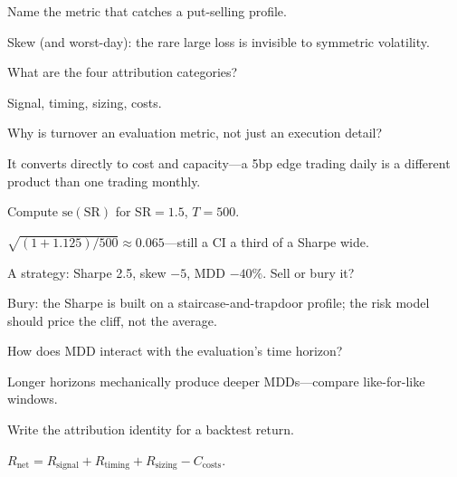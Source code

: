 \begin{exercise}[easy]
Name the metric that catches a put-selling profile.
\end{exercise}
\begin{solution}
Skew (and worst-day): the rare large loss is invisible to symmetric volatility.
\end{solution}

\begin{exercise}[easy]
What are the four attribution categories?
\end{exercise}
\begin{solution}
Signal, timing, sizing, costs.
\end{solution}

\begin{exercise}[easy]
Why is turnover an evaluation metric, not just an execution detail?
\end{exercise}
\begin{solution}
It converts directly to cost and capacity---a 5bp edge trading daily is a different
product than one trading monthly.
\end{solution}

\begin{exercise}
Compute $\mathrm{se}(\mathrm{SR})$ for SR${=}1.5$, $T{=}500$.
\end{exercise}
\begin{solution}
$\sqrt{(1+1.125)/500}\approx0.065$---still a CI a third of a Sharpe wide.
\end{solution}

\begin{exercise}
A strategy: Sharpe 2.5, skew $-5$, MDD $-40\%$. Sell or bury it?
\end{exercise}
\begin{solution}
Bury: the Sharpe is built on a staircase-and-trapdoor profile; the risk model should
price the cliff, not the average.
\end{solution}

\begin{exercise}
How does MDD interact with the evaluation's time horizon?
\end{exercise}
\begin{solution}
Longer horizons mechanically produce deeper MDDs---compare like-for-like windows.
\end{solution}

\begin{exercise}
Write the attribution identity for a backtest return.
\end{exercise}
\begin{solution}
$R_{\text{net}}=R_{\text{signal}}+R_{\text{timing}}+R_{\text{sizing}}-C_{\text{costs}}$.
\end{solution}

